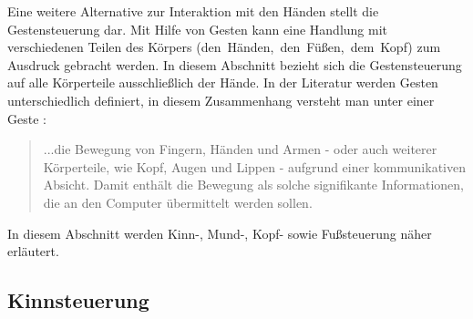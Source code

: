 Eine weitere Alternative zur Interaktion mit den Händen stellt die Gestensteuerung dar. Mit Hilfe von Gesten kann eine Handlung mit verschiedenen Teilen des Körpers \mbox{(\zB den Händen, den Füßen, dem Kopf)} zum Ausdruck gebracht werden. In diesem Abschnitt bezieht sich die Gestensteuerung auf alle Körperteile ausschließlich der Hände. In der Literatur werden Gesten unterschiedlich definiert, in diesem Zusammenhang versteht man unter einer Geste \cite{PreimDachselt}:
\begin{quote} ...die Bewegung von Fingern, Händen und Armen - oder auch weiterer Körperteile, wie Kopf, Augen und Lippen - aufgrund einer kommunikativen Absicht. Damit enthält die Bewegung als solche signifikante Informationen, die an den Computer übermittelt werden sollen. \end{quote}
In diesem Abschnitt werden Kinn-, Mund-, Kopf- sowie Fußsteuerung näher erläutert. 
%
%
\subsection{Kinnsteuerung}
\label{cha:Kinnsteuerung}

